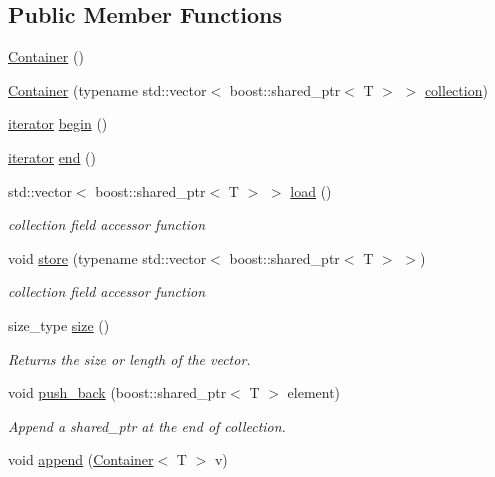 \subsection*{Public Member Functions}
\begin{DoxyCompactItemize}
\item 
\hyperlink{class_container_ab17ce1f67243b28abcd4c8113a72524c}{Container} ()
\item 
\hyperlink{class_container_a161e09c0c1cbe40429df228f7db63972}{Container} (typename std::vector$<$ boost::shared\_\-ptr$<$ T $>$ $>$ \hyperlink{class_container_a6cc12233bceb7d72709320d2c57e3398}{collection})
\item 
\hyperlink{class_container_afe880028d8304353129f47cd1d28c20a}{iterator} \hyperlink{class_container_ac5e2a75311f6e6a690ca67603490ddb1}{begin} ()
\item 
\hyperlink{class_container_afe880028d8304353129f47cd1d28c20a}{iterator} \hyperlink{class_container_a266eabe62963d6909d3aca7f105e203e}{end} ()
\item 
std::vector$<$ boost::shared\_\-ptr$<$ T $>$ $>$ \hyperlink{class_container_a9161a87726434f8955398137c647947c}{load} ()
\begin{DoxyCompactList}\small\item\em collection field accessor function \end{DoxyCompactList}\item 
void \hyperlink{class_container_aadc7faacbf43540e46144319f7369a3e}{store} (typename std::vector$<$ boost::shared\_\-ptr$<$ T $>$ $>$)
\begin{DoxyCompactList}\small\item\em collection field accessor function \end{DoxyCompactList}\item 
size\_\-type \hyperlink{class_container_a842c3d9eca81b78b59112fde9707b091}{size} ()
\begin{DoxyCompactList}\small\item\em Returns the size or length of the vector. \end{DoxyCompactList}\item 
void \hyperlink{class_container_afd87c69cb799ed7b434c29090083a285}{push\_\-back} (boost::shared\_\-ptr$<$ T $>$ element)
\begin{DoxyCompactList}\small\item\em Append a shared\_\-ptr at the end of collection. \end{DoxyCompactList}\item 
void \hyperlink{class_container_ae763eb37b721d401327c97016fb2fa54}{append} (\hyperlink{class_container}{Container}$<$ T $>$ v)

\end{DoxyCompactItemize}
